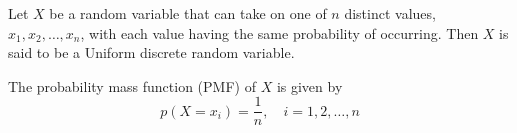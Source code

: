 \documentclass{article}
\begin{document}
Let \( X \) be a random variable that can take on one of \( n \) distinct values, \( x_1, x_2, \ldots, x_n \), with each value having the same probability of occurring. Then \( X \) is said to be a Uniform discrete random variable.

The probability mass function (PMF) of \( X \) is given by
\[
p(X = x_i) = \frac{1}{n}, \quad i = 1, 2, \ldots, n
\]
\end{document}
